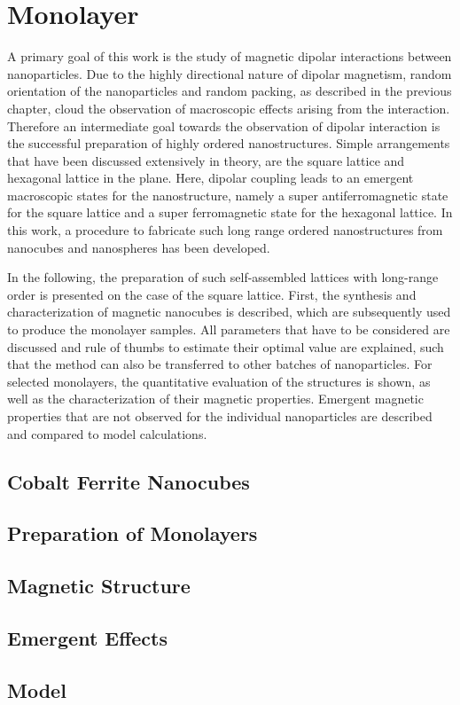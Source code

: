 \documentclass[\main/dresen_thesis.tex]{subfiles}
\renewcommand{\thisPath}{\main/chapters/monolayers}
\begin{document}
  \chapter{Monolayer}\label{ch:monolayers}
    A primary goal of this work is the study of magnetic dipolar interactions between nanoparticles.
    Due to the highly directional nature of dipolar magnetism, random orientation of the nanoparticles and random packing, as described in the previous chapter, cloud the observation of macroscopic effects arising from the interaction.
    Therefore an intermediate goal towards the observation of dipolar interaction is the successful preparation of highly ordered nanostructures.
    Simple arrangements that have been discussed extensively in theory, are the square lattice and hexagonal lattice in the plane.
    Here, dipolar coupling leads to an emergent macroscopic states for the nanostructure, namely a super antiferromagnetic state for the square lattice and a super ferromagnetic state for the hexagonal lattice.
    In this work, a procedure to fabricate such long range ordered nanostructures from nanocubes and nanospheres has been developed.

    In the following, the preparation of such self-assembled lattices with long-range order is presented on the case of the square lattice.
    First, the synthesis and characterization of magnetic nanocubes is described, which are subsequently used to produce the monolayer samples.
    All parameters that have to be considered are discussed and rule of thumbs to estimate their optimal value are explained, such that the method can also be transferred to other batches of nanoparticles.
    For selected monolayers, the quantitative evaluation of the structures is shown, as well as the characterization of their magnetic properties. Emergent magnetic properties that are not observed for the individual nanoparticles are described and compared to model calculations.

    \section{Cobalt Ferrite Nanocubes}
      

    \FloatBarrier
    \section{Preparation of Monolayers}
      

    \FloatBarrier
    \section{Magnetic Structure}
      

    \section{Emergent Effects}

    \section{Model}
\end{document}
